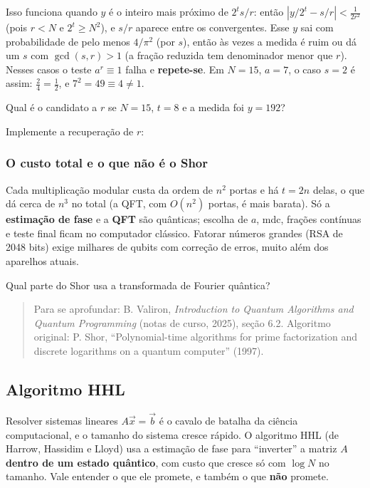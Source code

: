 Isso funciona quando \(y\) é o inteiro mais próximo de \(2^t s/r\): então \(|y/2^t-s/r|<\tfrac1{2r^2}\) (pois \(r<N\) e \(2^t\ge N^2\)), e \(s/r\) aparece entre os convergentes. Esse \(y\) sai com probabilidade de pelo menos \(4/\pi^2\) (por \(s\)), então às vezes a medida é ruim ou dá um \(s\) com \(\gcd(s,r)>1\) (a fração reduzida tem denominador menor que \(r\)). Nesses casos o teste \(a^r\equiv1\) falha e \textbf{repete-se}. Em \(N=15\), \(a=7\), o caso \(s=2\) é assim: \(\tfrac24=\tfrac12\), e \(7^2=49\equiv4\ne1\).

Qual é o candidato a \(r\) se \(N=15\), \(t=8\) e a medida foi \(y=192\)?

Implemente a recuperação de \(r\):

\subsubsection{O custo total e o que não é o Shor}\label{o-custo-total-e-o-que-nuxe3o-uxe9-o-shor}

Cada multiplicação modular custa da ordem de \(n^2\) portas e há \(t=2n\) delas, o que dá cerca de \(n^3\) no total (a QFT, com \(O(n^2)\) portas, é mais barata). Só a \textbf{estimação de fase} e a \textbf{QFT} são quânticas; escolha de \(a\), mdc, frações contínuas e teste final ficam no computador clássico. Fatorar números grandes (RSA de 2048 bits) exige milhares de qubits com correção de erros, muito além dos aparelhos atuais.

Qual parte do Shor usa a transformada de Fourier quântica?

\begin{quote}
Para se aprofundar: B. Valiron, \emph{Introduction to Quantum Algorithms and Quantum Programming} (notas de curso, 2025), seção 6.2. Algoritmo original: P. Shor, ``Polynomial-time algorithms for prime factorization and discrete logarithms on a quantum computer'' (1997).
\end{quote}

\subsection{Algoritmo HHL}
Resolver sistemas lineares \(A\vec x=\vec b\) é o cavalo de batalha da ciência computacional, e o tamanho do sistema cresce rápido. O algoritmo HHL (de Harrow, Hassidim e Lloyd) usa a estimação de fase para ``inverter'' a matriz \(A\) \textbf{dentro de um estado quântico}, com custo que cresce só com \(\log N\) no tamanho. Vale entender o que ele promete, e também o que \textbf{não} promete.

